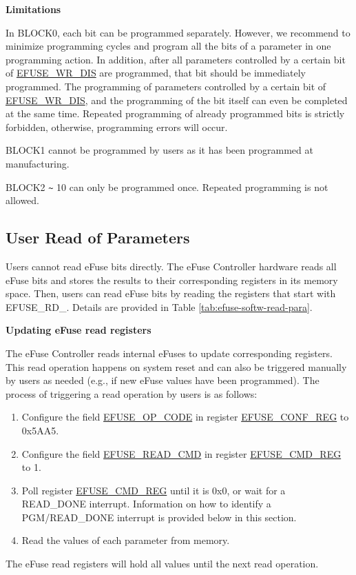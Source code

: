 \documentclass[main\_\_EN.tex]{subfiles}
\begin{document}
{\bfseries Limitations}

In BLOCK0, each bit can be programmed separately. However, we recommend to minimize programming cycles and program all the bits of a parameter in one programming action. In addition, after all parameters controlled by a certain bit of \hyperref[fielddesc:EFUSEWRDIS]{EFUSE\_WR\_DIS} are programmed, that bit should be immediately programmed. The programming of parameters controlled by a certain bit of \hyperref[fielddesc:EFUSEWRDIS]{EFUSE\_WR\_DIS},
and the programming of the bit itself can even be completed at the same time. Repeated programming of already programmed bits is strictly forbidden, otherwise, programming errors will occur.

BLOCK1 cannot be programmed by users as it has been programmed at manufacturing.

BLOCK2 \verb+~+ 10 can only be programmed once. Repeated programming is not allowed.

\subsection{User Read of Parameters}
\label{sec:efuse-software-read-para}

Users cannot read eFuse bits directly. The eFuse Controller hardware reads all eFuse bits and stores the results to their corresponding registers in its memory space. Then, users can read eFuse bits by reading the registers that start with EFUSE\_RD\_. Details are provided in Table \ref{tab:efuse-softw-read-para}.



{\bfseries Updating eFuse read registers}
\label{sec:efuse-update-reg}

The eFuse Controller reads internal eFuses to update corresponding registers. This read operation happens on system reset and can also be triggered manually by users as needed (e.g., if new eFuse values have been programmed). The process of triggering a read operation by users is as follows:

\begin{enumerate}
    \item Configure the field \hyperref[fielddesc:EFUSEOPCODE]{EFUSE\_OP\_CODE} in register \hyperref[regdesc:EFUSECONFREG]{EFUSE\_CONF\_REG} to 0x5AA5.
    \item Configure the field \hyperref[fielddesc:EFUSEREADCMD]{EFUSE\_READ\_CMD} in register \hyperref[regdesc:EFUSECMDREG]{EFUSE\_CMD\_REG} to 1.
    \item Poll register \hyperref[regdesc:EFUSECMDREG]{EFUSE\_CMD\_REG} until it is 0x0, or wait for a READ\_DONE interrupt. Information on how to identify a PGM/READ\_DONE interrupt is provided below in this section.
    \item Read the values of each parameter from memory.
\end{enumerate}
The eFuse read registers will hold all values until the next read operation.
\end{document}
